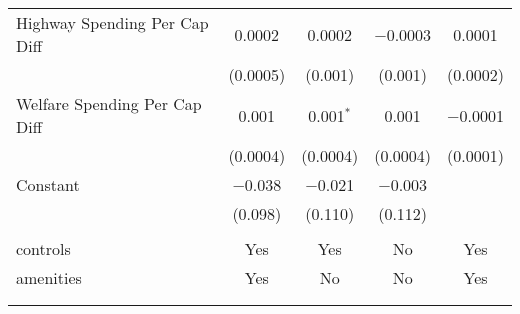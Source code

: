\begin{table}[!htbp]
\begin{tabular}{@{\extracolsep{5pt}}lcccc}
  Highway Spending Per Cap Diff & 0.0002 & 0.0002 & $-$0.0003 & 0.0001 \\ 
  & (0.0005) & (0.001) & (0.001) & (0.0002) \\ 
  Welfare Spending Per Cap Diff & 0.001 & 0.001$^{*}$ & 0.001 & $-$0.0001 \\ 
  & (0.0004) & (0.0004) & (0.0004) & (0.0001) \\ 
  Constant & $-$0.038 & $-$0.021 & $-$0.003 &  \\ 
  & (0.098) & (0.110) & (0.112) &  \\ 
 \hline \\[-1.8ex] 
controls & Yes & Yes & No & Yes \\ 
amenities & Yes & No & No & Yes \\ 
\hline \\[-1.8ex] 
\hline 
\hline \\[-1.8ex] 
\end{tabular} 
\end{table} 

